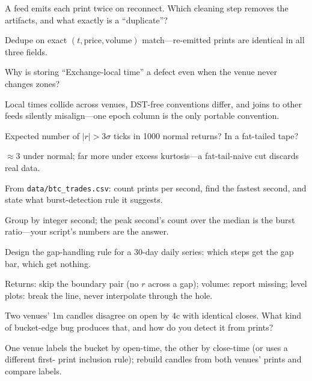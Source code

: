 \begin{exercise}[easy]
A feed emits each print twice on reconnect. Which cleaning step removes the artifacts, and
what exactly is a ``duplicate''?
\end{exercise}
\begin{solution}
Dedupe on exact $(t,\text{price},\text{volume})$ match---re-emitted prints are identical in
all three fields.
\end{solution}

\begin{exercise}[easy]
Why is storing ``Exchange-local time'' a defect even when the venue never changes zones?
\end{exercise}
\begin{solution}
Local times collide across venues, DST-free conventions differ, and joins to other feeds
silently misalign---one epoch column is the only portable convention.
\end{solution}

\begin{exercise}[easy]
Expected number of $|r|>3\sigma$ ticks in 1000 normal returns? In a fat-tailed tape?
\end{exercise}
\begin{solution}
$\approx3$ under normal; far more under excess kurtosis---a fat-tail-naive cut discards real
data.
\end{solution}

\begin{exercise}
From \texttt{data/btc\_trades.csv}: count prints per second, find the fastest second, and
state what burst-detection rule it suggests.
\end{exercise}
\begin{solution}
Group by integer second; the peak second's count over the median is the burst ratio---your
script's numbers are the answer.
\end{solution}

\begin{exercise}
Design the gap-handling rule for a 30-day daily series: which steps get the gap bar, which
get nothing.
\end{exercise}
\begin{solution}
Returns: skip the boundary pair (no $r$ across a gap); volume: report missing; level plots:
break the line, never interpolate through the hole.
\end{solution}

\begin{exercise}
Two venues' 1m candles disagree on open by 4c with identical closes. What kind of bucket-edge
bug produces that, and how do you detect it from prints?
\end{exercise}
\begin{solution}
One venue labels the bucket by open-time, the other by close-time (or uses a different first-
print inclusion rule); rebuild candles from both venues' prints and compare labels.
\end{solution}

